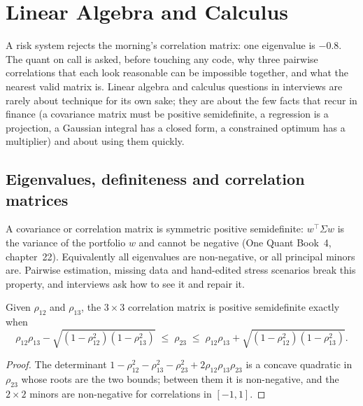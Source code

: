 \chapter{Linear Algebra and Calculus}\label{ch:iv:linear-algebra-and-calculus}

A risk system rejects the morning's correlation matrix: one eigenvalue is $-0.8$. The quant on call is asked, before
touching any code, why three pairwise correlations that each look reasonable can be impossible together, and what
the nearest valid matrix is. Linear algebra and calculus questions in interviews are rarely about technique for its
own sake; they are about the few facts that recur in finance (a covariance matrix must be positive semidefinite, a
regression is a projection, a Gaussian integral has a closed form, a constrained optimum has a multiplier) and about
using them quickly.

\section{Eigenvalues, definiteness and correlation matrices}

A covariance or correlation matrix is symmetric positive semidefinite: $w^\top \Sigma w$ is the variance of the
portfolio $w$ and cannot be negative (One Quant Book~4, chapter~22). Equivalently all eigenvalues are non-negative,
or all principal minors are. Pairwise estimation, missing data and hand-edited stress scenarios break this
property, and interviews ask how to see it and repair it.

\begin{proposition}\label{prop:iv:linear-algebra-and-calculus:third}
Given $\rho_{12}$ and $\rho_{13}$, the $3 \times 3$ correlation matrix is positive semidefinite exactly when
\[
\rho_{12}\rho_{13} - \sqrt{(1 - \rho_{12}^2)(1 - \rho_{13}^2)} \;\le\; \rho_{23} \;\le\;
\rho_{12}\rho_{13} + \sqrt{(1 - \rho_{12}^2)(1 - \rho_{13}^2)}.
\]
\end{proposition}

\begin{proof}
The determinant $1 - \rho_{12}^2 - \rho_{13}^2 - \rho_{23}^2 + 2\rho_{12}\rho_{13}\rho_{23}$ is a concave quadratic in
$\rho_{23}$ whose roots are the two bounds; between them it is non-negative, and the $2 \times 2$ minors are
non-negative for correlations in $[-1, 1]$.
\end{proof}


